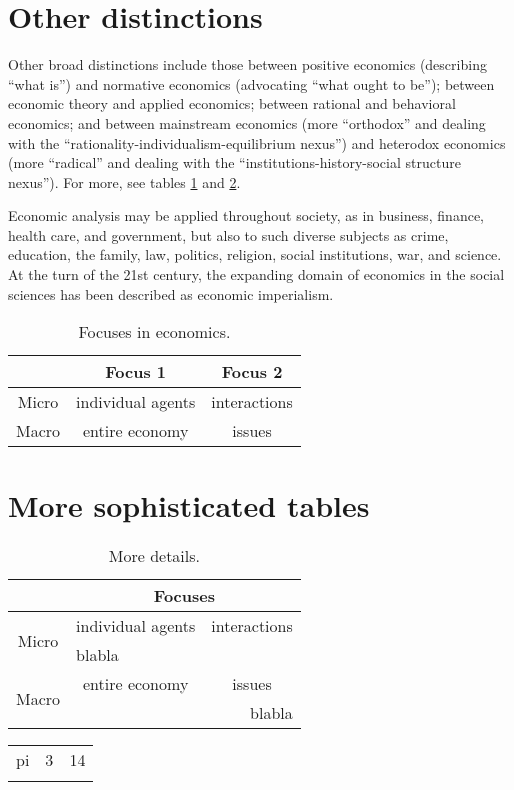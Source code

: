 \documentclass[11pt,a4paper]{article}	%
\begin{document}
\section*{Other distinctions}

Other broad distinctions include those between positive economics (describing ``what is'') and normative economics (advocating ``what ought to be''); between economic theory and applied economics; between rational and behavioral economics; and between mainstream economics (more ``orthodox'' and dealing with the ``rationality-individualism-equilibrium nexus'') and heterodox economics (more ``radical'' and dealing with the ``institutions-history-social structure nexus'').
For more, see tables \ref{tab:econ-focus} and \ref{tab:detail}.

Economic analysis may be applied throughout society, as in business, finance, health care, and government, but also to such diverse subjects as crime, education, the family, law, politics, religion, social institutions, war, and science.
At the turn of the 21st century, the expanding domain of economics in the social sciences has been described as economic imperialism.

\begin{table}[H]
\centering
\begin{tabular}{|c|c|c|}
\hline 
 & Focus 1 & Focus 2 \\ 
\hline 
Micro & individual agents & interactions \\ 
Macro & entire economy & issues \\
\hline 
\end{tabular}
\caption{Focuses in economics.}
\label{tab:econ-focus}
\end{table}

\section{More sophisticated tables}

\begin{table}[H]
\centering
\begin{tabular}{|c|cc|}
\cline{2-3}
\multicolumn{1}{c}{} & \multicolumn{2}{|c|}{Focuses} \\ 
\hline 
\multirow{2}{*}{Micro} & individual agents & interactions \\
& \multicolumn{2}{l|}{blabla} \\
\hline
\multirow{2}{*}{Macro} & entire economy & issues \\
& \multicolumn{2}{r|}{blabla} \\
\hline 
\end{tabular}
\caption{More details.}
\label{tab:detail}
\end{table}

\begin{table}[H]
\centering
\begin{tabular}{cr@{.}l}
\Xhline{3\arrayrulewidth}
pi & 3 & 14 \\
\Xhline{3\arrayrulewidth}
\end{tabular}
\end{table}

\end{document}
